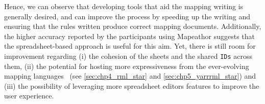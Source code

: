 Hence, we can observe that developing tools that aid the mapping writing is generally desired, and can improve the process by speeding up the writing and ensuring that the rules written produce correct mapping documents. Additionally, the higher accuracy reported by the participants using Mapeathor suggests that the spreadsheet-based approach is useful for this aim. Yet, there is still room for improvement regarding (i) the cohesion of the sheets and the shared \texttt{IDs} across them, (ii) the potential for hosting more expressiveness from the ever-evolving mapping languages~\parencite{iglesias2023rml} (see \cref{sec:chp4_rml_star} and \cref{sec:chp5_yarrrml_star}) and (iii) the possibility of leveraging more spreadsheet editors features to improve the user experience. 



